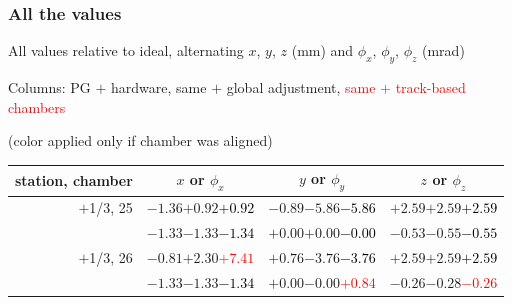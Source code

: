\documentclass[compress]{beamer}
\begin{document}
\begin{frame}
\frametitle{All the values}
\tiny

All values relative to ideal, alternating $x$, $y$, $z$ (mm) and $\phi_x$, $\phi_y$, $\phi_z$ (mrad)

Columns: PG $+$ hardware, same $+$ global adjustment, \textcolor{red}{same $+$ track-based chambers}

\hfill (color applied only if chamber was aligned)

\vfill
\renewcommand{\arraystretch}{1.1}
\begin{tabular}{r | c | c | c}
station, chamber & $x$ or $\phi_x$ & $y$ or $\phi_y$ & $z$ or $\phi_z$ \\\hline
$+$1/3, 25 & $-1.36$\hspace{0.1 cm}$+0.92$\hspace{0.1 cm}\textcolor{black}{$+0.92$} & $-0.89$\hspace{0.1 cm}$-5.86$\hspace{0.1 cm}\textcolor{black}{$-5.86$} & $+2.59$\hspace{0.1 cm}$+2.59$\hspace{0.1 cm}\textcolor{black}{$+2.59$} \\
           & $-1.33$\hspace{0.1 cm}$-1.33$\hspace{0.1 cm}\textcolor{black}{$-1.34$} & $+0.00$\hspace{0.1 cm}$+0.00$\hspace{0.1 cm}\textcolor{black}{$-0.00$} & $-0.53$\hspace{0.1 cm}$-0.55$\hspace{0.1 cm}\textcolor{black}{$-0.55$} \\
$+$1/3, 26 & $-0.81$\hspace{0.1 cm}$+2.30$\hspace{0.1 cm}\textcolor{red}{$+7.41$} & $+0.76$\hspace{0.1 cm}$-3.76$\hspace{0.1 cm}\textcolor{black}{$-3.76$} & $+2.59$\hspace{0.1 cm}$+2.59$\hspace{0.1 cm}\textcolor{black}{$+2.59$} \\
           & $-1.33$\hspace{0.1 cm}$-1.33$\hspace{0.1 cm}\textcolor{black}{$-1.34$} & $+0.00$\hspace{0.1 cm}$-0.00$\hspace{0.1 cm}\textcolor{red}{$+0.84$} & $-0.26$\hspace{0.1 cm}$-0.28$\hspace{0.1 cm}\textcolor{red}{$-0.26$} \\

\end{tabular}
\end{frame}
\end{document}
